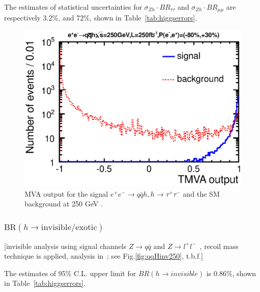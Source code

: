  The estimates of statistical uncertainties for $\sigma_{Zh}\cdot BR_{\tau\tau}$ and
$\sigma_{Zh}\cdot BR_{\mu\mu}$ are respectively
3.2\%, and 72\%, shown in Table~\ref{tab:higgserrors}.

\begin{figure}
\begin{center}
\includegraphics[width=0.85\hsize]{chapters/figures/ZH_qqtautau250_TMVA.eps}
\end{center}
  \caption{MVA output for the signal $e^+e^-\to q\bar{q} h, h\to\tau^+\tau^-$
 and the SM background at 250 GeV \cite{Kawada:2015wea}.}
  \label{fig:qqHtautau250}
\end{figure}

\subsubsection{$\mathrm{BR}(h\to \mathrm{invisible/exotic})$}
\label{sec:higgs:invisible}
[invisible analysis using signal channels $Z\to q\bar{q}$ and $Z\to l^+l^-$~\cite{},
recoil mass technique is applied, analysis in~\cite{Ishikawa:2014,Tian:2015}; 
see Fig.\ref{fig:qqHinv250}, t.b.f.]

The estimates of 95\% C.L. upper limit for $BR(h\to invisible)$
is 0.86\%, shown in Table~\ref{tab:higgserrors}.

